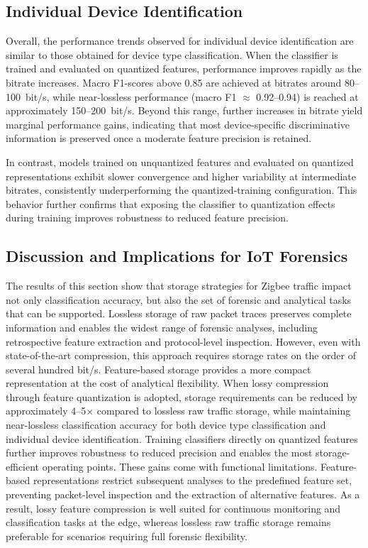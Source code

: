 \subsection{Individual Device Identification}
Overall, the performance trends observed for individual device identification are similar to those obtained for device type classification. When the classifier is trained and evaluated on quantized features, performance improves rapidly as the bitrate increases. Macro F1-scores above 0.85 are achieved at bitrates around 80--100~bit/s, while near-lossless performance (macro F1 $\approx$ 0.92--0.94) is reached at approximately 150--200~bit/s. Beyond this range, further increases in bitrate yield marginal performance gains, indicating that most device-specific discriminative information is preserved once a moderate feature precision is retained.

In contrast, models trained on unquantized features and evaluated on quantized representations exhibit slower convergence and higher variability at intermediate bitrates, consistently underperforming the quantized-training configuration. This behavior further confirms that exposing the classifier to quantization effects during training improves robustness to reduced feature precision.


\subsection{Discussion and Implications for IoT Forensics}
The results of this section show that storage strategies for Zigbee traffic impact not only classification accuracy, but also the set of forensic and analytical tasks that can be supported. Lossless storage of raw packet traces preserves complete information and enables the widest range of forensic analyses, including retrospective feature extraction and protocol-level inspection. However, even with state-of-the-art compression, this approach requires storage rates on the order of several hundred bit/s.
Feature-based storage provides a more compact representation at the cost of analytical flexibility. When lossy compression through feature quantization is adopted, storage requirements can be reduced by approximately 4--5$\times$ compared to lossless raw traffic storage, while maintaining near-lossless classification accuracy for both device type classification and individual device identification. Training classifiers directly on quantized features further improves robustness to reduced precision and enables the most storage-efficient operating points.
These gains come with functional limitations. Feature-based representations restrict subsequent analyses to the predefined feature set, preventing packet-level inspection and the extraction of alternative features. As a result, lossy feature compression is well suited for continuous monitoring and classification tasks at the edge, whereas lossless raw traffic storage remains preferable for scenarios requiring full forensic flexibility.
